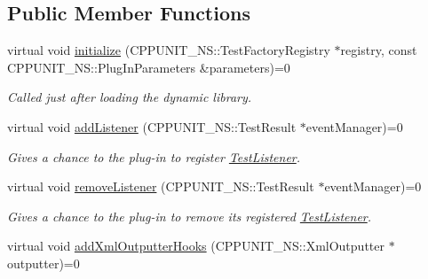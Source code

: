 \subsection*{Public Member Functions}
\begin{DoxyCompactItemize}
\item 
virtual void \hyperlink{struct_cpp_unit_test_plug_in_aec670330e7fced26c2a66b1dcd56edc0}{initialize} (C\+P\+P\+U\+N\+I\+T\+\_\+\+N\+S\+::\+Test\+Factory\+Registry $\ast$registry, const C\+P\+P\+U\+N\+I\+T\+\_\+\+N\+S\+::\+Plug\+In\+Parameters \&parameters)=0
\begin{DoxyCompactList}\small\item\em Called just after loading the dynamic library. \end{DoxyCompactList}\item 
virtual void \hyperlink{struct_cpp_unit_test_plug_in_aad8038dc72d0f9798379937fe5692c97}{add\+Listener} (C\+P\+P\+U\+N\+I\+T\+\_\+\+N\+S\+::\+Test\+Result $\ast$event\+Manager)=0
\begin{DoxyCompactList}\small\item\em Gives a chance to the plug-\/in to register \hyperlink{class_test_listener}{Test\+Listener}. \end{DoxyCompactList}\item 
virtual void \hyperlink{struct_cpp_unit_test_plug_in_a8f36157014b515d38efbc8ab67923d85}{remove\+Listener} (C\+P\+P\+U\+N\+I\+T\+\_\+\+N\+S\+::\+Test\+Result $\ast$event\+Manager)=0
\begin{DoxyCompactList}\small\item\em Gives a chance to the plug-\/in to remove its registered \hyperlink{class_test_listener}{Test\+Listener}. \end{DoxyCompactList}\item 
virtual void \hyperlink{struct_cpp_unit_test_plug_in_a547cfddd0513dc9182721f723e27d9e3}{add\+Xml\+Outputter\+Hooks} (C\+P\+P\+U\+N\+I\+T\+\_\+\+N\+S\+::\+Xml\+Outputter $\ast$outputter)=0\hypertarget{struct_cpp_unit_test_plug_in_a547cfddd0513dc9182721f723e27d9e3}{}\label{struct_cpp_unit_test_plug_in_a547cfddd0513dc9182721f723e27d9e3}


\end{DoxyCompactItemize}
